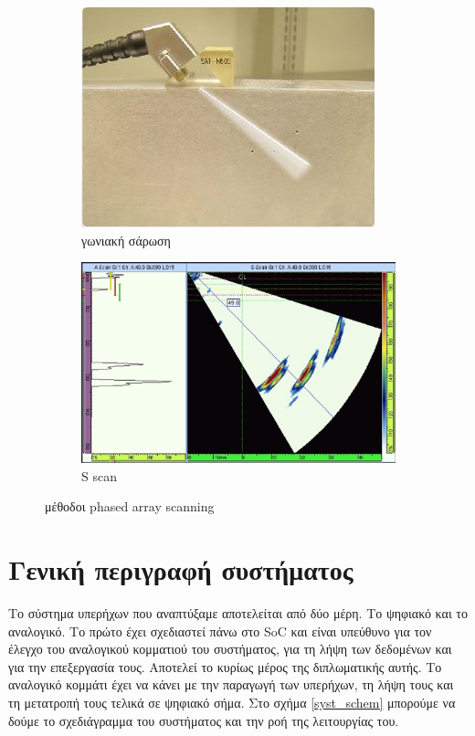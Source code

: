 \documentclass[12pt,a4paper]{book}
\begin{document}
\begin{figure}
\begin{subfigure}[b]{0.4\textwidth}
		\includegraphics[width=\textwidth]{sectorial_scan}
		\caption{γωνιακή σάρωση}
		\label{sectorial_scan}
	\end{subfigure}	
	\begin{subfigure}[b]{0.4\textwidth}
		\includegraphics[width=\textwidth]{s_scan}
		\caption{S scan}
		\label{s_scan}
	\end{subfigure}
	\caption{μέθοδοι phased array scanning}
\end{figure}

\chapter{Γενική περιγραφή συστήματος}
Το σύστημα υπερήχων που αναπτύξαμε αποτελείται από δύο μέρη. Το ψηφιακό και το αναλογικό. Το πρώτο έχει σχεδιαστεί πάνω στο SoC και είναι υπεύθυνο για τον έλεγχο του αναλογικού κομματιού του συστήματος, για τη λήψη των δεδομένων και για την επεξεργασία τους. Αποτελεί το κυρίως μέρος της διπλωματικής αυτής. Το αναλογικό κομμάτι έχει να κάνει με την παραγωγή των υπερήχων, τη λήψη τους και τη μετατροπή τους τελικά σε ψηφιακό σήμα. Στο σχήμα \ref{syst_schem} μπορούμε να δούμε το σχεδιάγραμμα του συστήματος και την ροή της λειτουργίας του.
\end{document}
